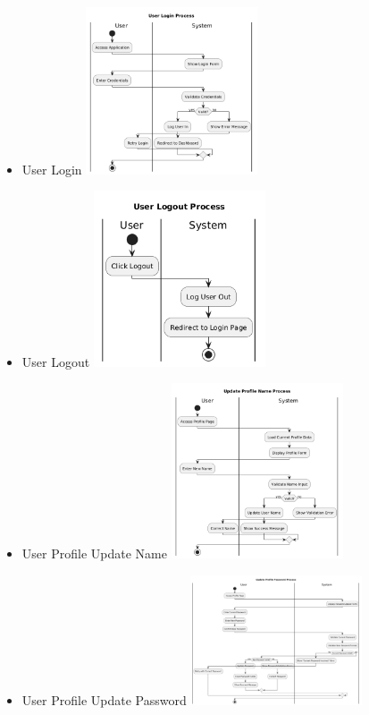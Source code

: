 \begin{itemize}
  \item User Login
  \newline
  \includegraphics[width=0.4\textwidth]{assets/activity_diagrams/user_login.png}
  \item User Logout
  \newline
  \includegraphics[width=0.4\textwidth]{assets/activity_diagrams/user_logout.png}
  \item User Profile Update Name
  \newline
  \includegraphics[width=0.4\textwidth]{assets/activity_diagrams/user_profile_update_name.png}
  \item User Profile Update Password
  \newline
  \includegraphics[width=0.4\textwidth]{assets/activity_diagrams/user_profile_update_password.png}

\end{itemize}
